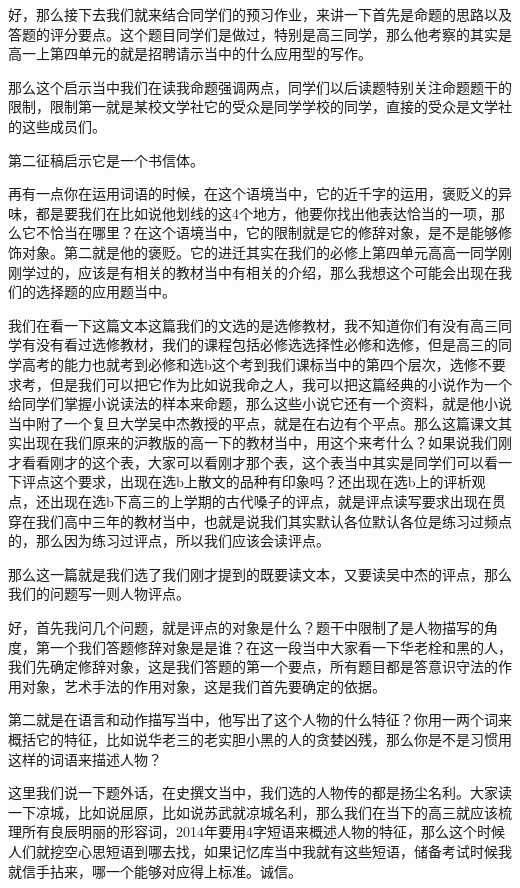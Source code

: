 \documentclass{ctexart}
\renewcommand{\\}{\par}
\begin{document}
好，那么接下去我们就来结合同学们的预习作业，来讲一下首先是命题的思路以及答题的评分要点。这个题目同学们是做过，特别是高三同学，那么他考察的其实是高一上第四单元的就是招聘请示当中的什么应用型的写作。

那么这个启示当中我们在读我命题强调两点，同学们以后读题特别关注命题题干的限制，限制第一就是某校文学社它的受众是同学学校的同学，直接的受众是文学社的这些成员们。

第二征稿启示它是一个书信体。

再有一点你在运用词语的时候，在这个语境当中，它的近千字的运用，褒贬义的异味，都是要我们在比如说他划线的这4个地方，他要你找出他表达恰当的一项，那么它不恰当在哪里？在这个语境当中，它的限制就是它的修辞对象，是不是能够修饰对象。第二就是他的褒贬。它的进迁其实在我们的必修上第四单元高高一同学刚刚学过的，应该是有相关的教材当中有相关的介绍，那么我想这个可能会出现在我们的选择题的应用题当中。

我们在看一下这篇文本这篇我们的文选的是选修教材，我不知道你们有没有高三同学有没有看过选修教材，我们的课程包括必修选选择性必修和选修，但是高三的同学高考的能力也就考到必修和选b这个考到我们课标当中的第四个层次，选修不要求考，但是我们可以把它作为比如说我命之人，我可以把这篇经典的小说作为一个给同学们掌握小说读法的样本来命题，那么这些小说它还有一个资料，就是他小说当中附了一个复旦大学吴中杰教授的平点，就是在右边有个平点。那么这篇课文其实出现在我们原来的沪教版的高一下的教材当中，用这个来考什么？如果说我们刚才看看刚才的这个表，大家可以看刚才那个表，这个表当中其实是同学们可以看一下评点这个要求，出现在选b上散文的品种有印象吗？还出现在选b上的评析观点，还出现在选b下高三的上学期的古代嗓子的评点，就是评点读写要求出现在贯穿在我们高中三年的教材当中，也就是说我们其实默认各位默认各位是练习过频点的，那么因为练习过评点，所以我们应该会读评点。

那么这一篇就是我们选了我们刚才提到的既要读文本，又要读吴中杰的评点，那么我们的问题写一则人物评点。

好，首先我问几个问题，就是评点的对象是什么？题干中限制了是人物描写的角度，第一个我们答题修辞对象是是谁？在这一段当中大家看一下华老栓和黑的人，我们先确定修辞对象，这是我们答题的第一个要点，所有题目都是答意识守法的作用对象，艺术手法的作用对象，这是我们首先要确定的依据。

第二就是在语言和动作描写当中，他写出了这个人物的什么特征？你用一两个词来概括它的特征，比如说华老三的老实胆小黑的人的贪婪凶残，那么你是不是习惯用这样的词语来描述人物？

这里我们说一下题外话，在史撰文当中，我们选的人物传的都是扬尘名利。大家读一下凉城，比如说屈原，比如说苏武就凉城名利，那么我们在当下的高三就应该梳理所有良辰明丽的形容词，2014年要用4字短语来概述人物的特征，那么这个时候人们就挖空心思短语到哪去找，如果记忆库当中我就有这些短语，储备考试时候我就信手拈来，哪一个能够对应得上标准。诚信。
\end{document}
